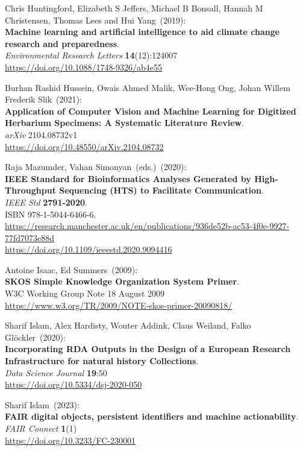 \begin{thebibliography}{9}
Chris Huntingford, Elizabeth S Jeffers, Michael B Bonsall, Hannah M Christensen, Thomas Lees and Hui Yang~(2019): \\
\textbf{Machine learning and artificial intelligence to aid climate change research and preparedness}.\\
\emph{Environmental Research Letters} \textbf{14}(12):124007\\
\url{https://doi.org/10.1088/1748-9326/ab4e55}

Burhan Rashid Hussein, Owais Ahmed Malik, Wee-Hong Ong, Johan Willem Frederik Slik~(2021): \\
\textbf{Application of Computer Vision and Machine Learning for Digitized Herbarium Specimens: A Systematic Literature Review}.\\
\emph{arXiv} 2104.08732v1\\
\url{https://doi.org/10.48550/arXiv.2104.08732}

Raja Mazumder, Vahan Simonyan~(eds.)~(2020): \\
\textbf{IEEE Standard for Bioinformatics Analyses Generated by High-Throughput Sequencing (HTS) to Facilitate Communication}.\\
\emph{IEEE Std} \textbf{2791-2020}.\\
ISBN 978-1-5044-6466-6.\\
\url{https://research.manchester.ac.uk/en/publications/936de52b-ac53-4f0e-9927-77fd7073e88d}\\
\url{https://doi.org/10.1109/ieeestd.2020.9094416}

Antoine Isaac, Ed Summers~(2009): \\
\textbf{SKOS Simple Knowledge Organization System Primer}. \\
W3C Working Group Note 18 August 2009 \\
\url{https://www.w3.org/TR/2009/NOTE-skos-primer-20090818/}

Sharif Islam, Alex Hardisty, Wouter Addink, Claus Weiland, Falko Glöckler~(2020): \\
\textbf{Incorporating RDA Outputs in the Design of a European Research Infrastructure for natural history Collections}.\\
\emph{Data Science Journal} \textbf{19}:50\\
\url{https://doi.org/10.5334/dsj-2020-050}

Sharif Islam~(2023): \\
\textbf{FAIR digital objects, persistent identifiers and machine actionability}. \\
\emph{FAIR Connect} \textbf{1}(1) \\
\url{https://doi.org/10.3233/FC-230001}


\end{thebibliography}
